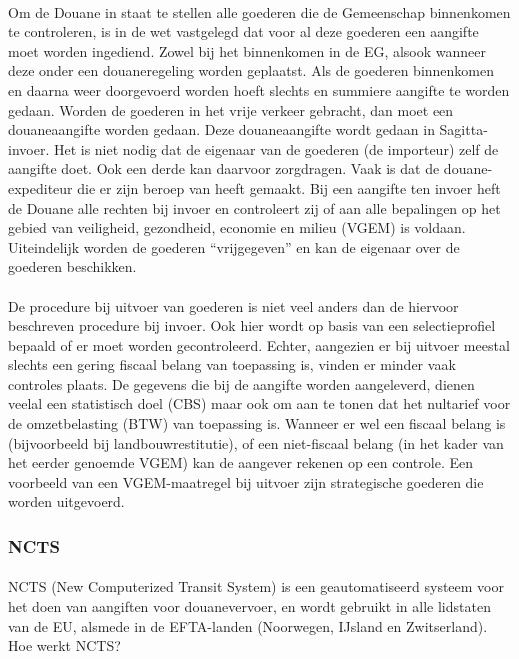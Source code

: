 \paragraph {} Om de Douane in staat te stellen alle goederen die de Gemeenschap binnenkomen te
controleren, is in de wet vastgelegd dat voor al deze goederen een aangifte moet worden
ingediend. Zowel bij het binnenkomen in de EG, alsook wanneer deze onder een douaneregeling
worden geplaatst. Als de goederen binnenkomen en daarna weer doorgevoerd worden hoeft
slechts en summiere aangifte te worden gedaan. Worden de goederen in het vrije verkeer
gebracht, dan moet een douaneaangifte worden gedaan. Deze douaneaangifte wordt gedaan in
Sagitta-invoer. Het is niet nodig dat de eigenaar van de goederen (de importeur) zelf de
aangifte doet. Ook een derde kan daarvoor zorgdragen. Vaak is dat de douane-expediteur
die er zijn beroep van heeft gemaakt. Bij een aangifte ten invoer heft de Douane alle
rechten bij invoer en controleert zij of aan alle bepalingen op het gebied van
veiligheid, gezondheid, economie en milieu (VGEM) is voldaan. Uiteindelijk worden de
goederen “vrijgegeven” en kan de eigenaar over de goederen beschikken.


\paragraph {} De procedure bij uitvoer van goederen is niet veel anders dan de hiervoor
beschreven procedure bij invoer. Ook hier wordt op basis van een selectieprofiel bepaald
of er moet worden gecontroleerd. Echter, aangezien er bij uitvoer meestal slechts een
gering fiscaal belang van toepassing is, vinden er minder vaak controles plaats. De
gegevens die bij de aangifte worden aangeleverd, dienen veelal een statistisch doel (CBS)
maar ook om aan te tonen dat het nultarief voor de omzetbelasting (BTW) van toepassing is.
Wanneer er wel een fiscaal belang is (bijvoorbeeld bij landbouwrestitutie), of een
niet-fiscaal belang (in het kader van het eerder genoemde VGEM) kan de aangever rekenen op
een controle. Een voorbeeld van een VGEM-maatregel bij uitvoer zijn strategische goederen
die worden uitgevoerd.


\subsubsection {NCTS}

\paragraph {} NCTS (New Computerized Transit System) is een geautomatiseerd systeem  voor het doen van
aangiften voor douanevervoer, en wordt gebruikt in alle lidstaten van de EU, alsmede in
de EFTA-landen (Noorwegen, IJsland en Zwitserland).
Hoe werkt NCTS?


